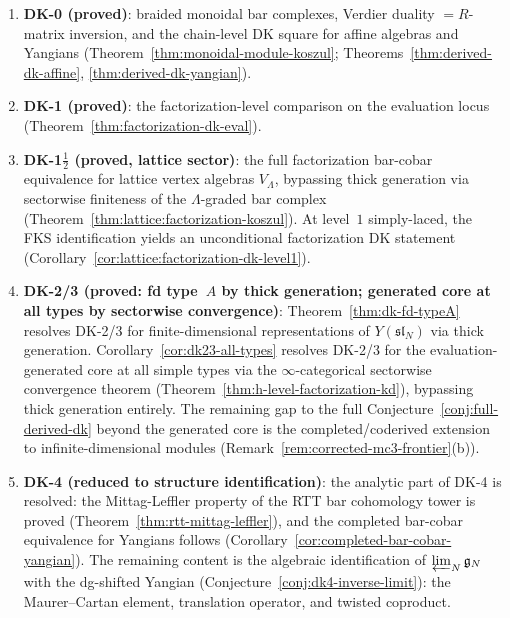 \begin{enumerate}[label=\textup{(\roman*)}]
\item \textbf{DK-0 \textup{(}proved\textup{)}}:
  braided monoidal bar complexes, Verdier duality
  $= R$-matrix inversion, and the chain-level DK square for affine
  algebras and Yangians
  \textup{(}Theorem~\ref{thm:monoidal-module-koszul};
  Theorems~\ref{thm:derived-dk-affine},
  \ref{thm:derived-dk-yangian}\textup{)}.
\item \textbf{DK-1 \textup{(}proved\textup{)}}:
  the factorization-level comparison on the evaluation locus
  \textup{(}Theorem~\ref{thm:factorization-dk-eval}\textup{)}.
\item \textbf{DK-1$\frac{1}{2}$ \textup{(}proved, lattice sector\textup{)}}:
  the full factorization bar-cobar equivalence for lattice vertex
  algebras $V_\Lambda$, bypassing thick generation via sectorwise
  finiteness of the $\Lambda$-graded bar complex
  \textup{(}Theorem~\ref{thm:lattice:factorization-koszul}\textup{)}.
  At level~$1$ simply-laced, the FKS identification
  yields an unconditional factorization DK statement
  \textup{(}Corollary~\ref{cor:lattice:factorization-dk-level1}\textup{)}.
\item \textbf{DK-2/3 \textup{(}proved: fd type~$A$ by thick
  generation; generated core at all types by sectorwise
  convergence\textup{)}}:
  Theorem~\ref{thm:dk-fd-typeA} resolves DK-2/3 for
  finite-dimensional representations of $Y(\mathfrak{sl}_N)$
  via thick generation.
  Corollary~\ref{cor:dk23-all-types} resolves DK-2/3 for the
  evaluation-generated core at all simple types via the
  $\infty$-categorical sectorwise convergence theorem
  (Theorem~\ref{thm:h-level-factorization-kd}), bypassing thick
  generation entirely.  The remaining gap to the full
  Conjecture~\ref{conj:full-derived-dk} beyond the generated core
  is the completed/coderived extension to infinite-dimensional
  modules
  \textup{(}Remark~\ref{rem:corrected-mc3-frontier}(b)\textup{)}.
\item \textbf{DK-4 \textup{(}reduced to structure identification\textup{)}}:
  the analytic part of DK-4 is resolved:
  the Mittag-Leffler property of the RTT bar cohomology tower
  is proved (Theorem~\ref{thm:rtt-mittag-leffler}), and the
  completed bar-cobar equivalence for Yangians follows
  (Corollary~\ref{cor:completed-bar-cobar-yangian}).
  The remaining content is the algebraic identification of
  $\varprojlim_N \mathfrak{g}_N$ with the dg-shifted Yangian
  (Conjecture~\ref{conj:dk4-inverse-limit}): the Maurer--Cartan
  element, translation operator, and twisted coproduct.

\end{enumerate}
